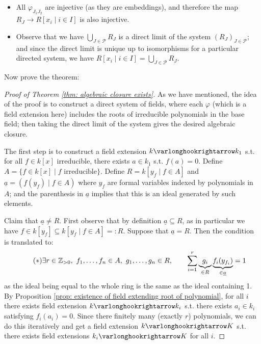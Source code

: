 \begin{itemize}
    \item All $\varphi_{J_1 J_2}$ are injective (as they are embeddings), and therefore the map $R_J \to R[x_i \mid i \in I]$ is also injective.
    \item Observe that we have $\bigcup_{J \in \mathcal{P}} R_J$ is a direct limit of the system $(R_J)_{J \in \mathcal{P}}$; and since the direct limit is unique up to isomorphisms for a particular directed system, we have $R[x_i \mid i \in I] = \bigcup_{J \in \mathcal{P}} R_J$.
\end{itemize}

Now prove the theorem:

\begin{proof}[Proof of Theorem \ref{thm: algebraic closure exists}]
    As we have mentioned, the idea of the proof is to construct a direct system of fields, where each $\varphi$ (which is a field extension here) includes the roots of irreducible polynomials in the base field; then taking the direct limit of the system gives the desired algebraic closure. 

    The first step is to construct a field extension $k \ext k_1$ s.t. for all $f \in k[x]$ irreducible, there exists $a \in k_1$ s.t. $f(a) = 0$. Define $A = \{ f \in k[x] \mid f \text{ irreducible} \}$. Define $R = k[y_f \mid f \in A]$ and $\underline{a} = (f(y_f) \mid f \in A)$ where $y_f$ are formal variables indexed by polynomials in $A$; and the parenthesis in $\underline{a}$ implies that this is an ideal generated by such elements. 

    Claim that $\underline{a} \neq R$. First observe that by definition $\underline{a} \subseteq R$, as in particular we have $f \in k[y_f] \subseteq k[y_f \mid f \in A] =: R$. Suppose that $\underline{a} = R$. Then the condition is translated to:
    \begin{equation}\label{eq: condition if a_ = R}
        \tag{$\ast$}        
        \exists r \in \mathbb{Z}_{>0},\ f_1, \dots, f_n \in A,\ g_1, \dots, g_n \in R, \qquad \sum_{i = 1}^r \underbrace{g_i}_{\in R} \underbrace{f_i (y_{f_i})} _{\in \underline{a}} = 1
    \end{equation}
    as the ideal being equal to the whole ring is the same as the ideal containing 1. By Proposition \ref{prop: existence of field extending root of polynomial}, for all $i$ there exists field extension $k \ext k_i$ s.t. there exists $a_i \in k_i$ satisfying $f_i(a_i) = 0$. Since there finitely many (exactly $r$) polynomials, we can do this iteratively and get a field extension $k \ext K$ s.t. there exists field extensions $k_i \ext K$ for all $i$.


\end{proof}
